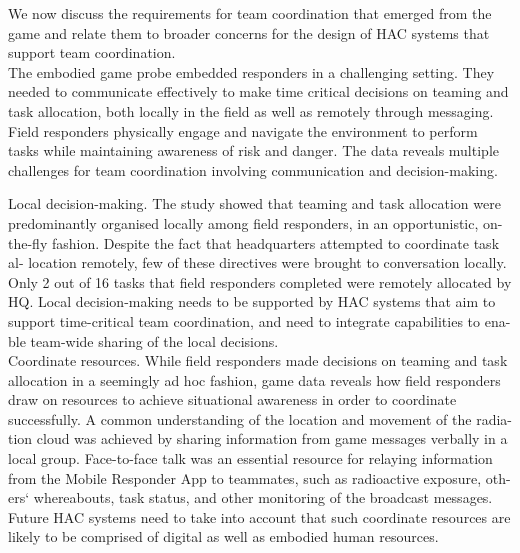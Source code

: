 We now discuss the requirements for team coordination that emerged from the game and relate them to broader concerns for the design of HAC systems that support team coordination.\\

The embodied game probe embedded responders in a challenging setting. They needed to communicate effectively to make time critical decisions on teaming and task allocation, both locally in the field as well as remotely through messaging. Field responders physically engage and navigate the environment to perform tasks while maintaining awareness of risk and danger. The data reveals multiple challenges for team coordination involving communication and decision-making. 

Local decision-making. The study showed that teaming and task allocation were predominantly organised locally among field responders, in an opportunistic, on- the-fly fashion. Despite the fact that headquarters attempted to coordinate task al- location remotely, few of these directives were brought to conversation locally. Only 2 out of 16 tasks that field responders completed were remotely allocated by HQ. Local decision-making needs to be supported by HAC systems that aim to support time-critical team coordination, and need to integrate capabilities to ena- ble team-wide sharing of the local decisions.\\

Coordinate resources. While field responders made decisions on teaming and task allocation in a seemingly ad hoc fashion, game data reveals how field responders draw on resources to achieve situational awareness in order to coordinate successfully. A common understanding of the location and movement of the radia- tion cloud was achieved by sharing information from game messages verbally in a local group. Face-to-face talk was an essential resource for relaying information from the Mobile Responder App to teammates, such as radioactive exposure, oth- ers` whereabouts, task status, and other monitoring of the broadcast messages. Future HAC systems need to take into account that such coordinate resources are likely to be comprised of digital as well as embodied human resources. 

